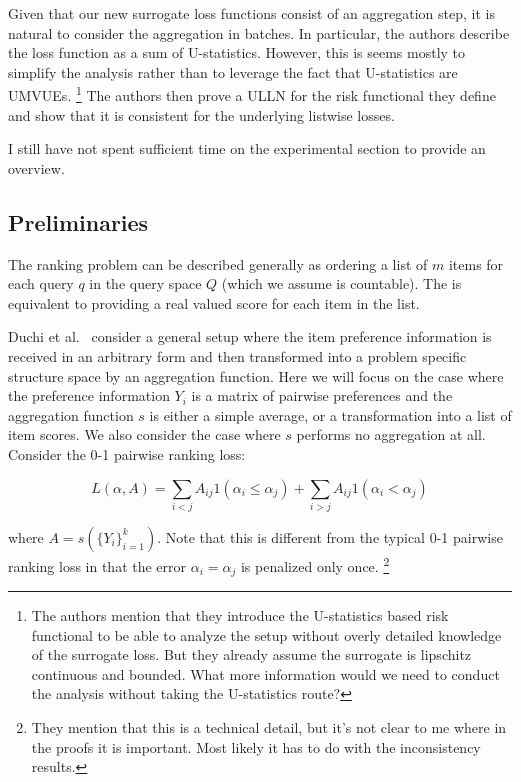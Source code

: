 \documentclass[a4paper,10pt]{article}
\begin{document}
Given that our new surrogate loss functions consist of an aggregation
step, it is natural to consider the aggregation in batches. In
particular, the authors describe the loss function as a sum of
U-statistics. However, this is seems mostly to simplify the analysis
rather than to leverage the fact that U-statistics are UMVUEs.
\footnote{The authors mention that they introduce the U-statistics
  based risk functional to be able to analyze the setup without overly
  detailed knowledge of the surrogate loss. But they already assume
  the surrogate is lipschitz continuous and bounded. What more
  information would we need to conduct the analysis without taking the
  U-statistics route?}
The authors then prove a ULLN for the risk
functional they define and show that it is consistent for the
underlying listwise losses.

I still have not spent sufficient time on the experimental section to provide an overview.

\subsection{Preliminaries}

The ranking problem can be described generally as ordering a list of
\(m\) items for each query \(q\) in the query space \(Q\) (which we
assume is countable). The is equivalent to providing a real valued
score for each item in the list.

Duchi et al.~\cite{duchi-2013-ranking} consider a general setup where
the item preference information is received in an arbitrary form and
then transformed into a problem specific structure space by an
aggregation function. Here we will focus on the case where the
preference information $Y_i$ is a matrix of pairwise preferences and
the aggregation function $s$ is either a simple average, or a
transformation into a list of item scores. We also consider the case
where $s$ performs no aggregation at all. Consider the 0-1 pairwise
ranking loss:

\begin{equation} \label{eq:general-loss}
  L(\alpha, A) = \sum_{i<j} A_{ij}1(\alpha_i \leq \alpha_j) + \sum_{i>j} A_{ij}1(\alpha_i < \alpha_j)
\end{equation}

where $A = s(\{Y_i\}_{i=1}^k)$. Note that this is different from the typical 0-1 pairwise ranking loss in that the error \(\alpha_i = \alpha_j\) is penalized only once.
\footnote{They mention that this is a technical detail, but it's not clear to me where in the proofs it is important. Most likely it has to do with the inconsistency results.}
\end{document}
